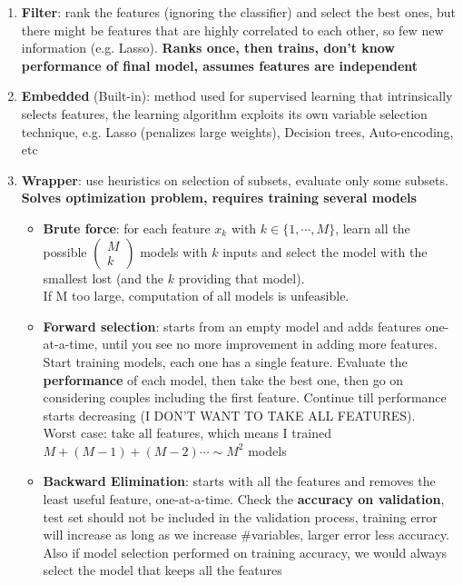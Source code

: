     \begin{enumerate}
        \item \textbf{Filter}: rank the features (ignoring the classifier) and select the best ones, but there might be features that are highly correlated to each other, so few new information (e.g. Lasso). \textbf{Ranks once, then trains, don't know performance of final model, assumes features are independent}
        \item \textbf{Embedded} (Built-in): method used for supervised learning that intrinsically selects features, the learning algorithm exploits its own variable selection technique, e.g. Lasso (penalizes large weights), Decision trees, Auto-encoding, etc
        \item \textbf{Wrapper}: use heuristics on selection of subsets, evaluate only some subsets. \textbf{Solves optimization problem, requires training several models}
        \begin{itemize}
            \item \textbf{Brute force}: for each feature $x_k$ with $k\in\{1,\cdots,M\}$, learn all the possible $\begin{pmatrix}
                M \\ k
            \end{pmatrix}$ models with $k$ inputs and select the model with the smallest lost (and the $k$ providing that model).\\
            If M too large, computation of all models is unfeasible.
            \item \textbf{Forward selection}: starts from an empty model and adds features one-at-a-time, until you see no more improvement in adding more features.\\
            Start training models, each one has a single feature. Evaluate the \textbf{performance} of each model, then take the best one, then go on considering couples including the first feature. Continue till performance starts decreasing (I DON'T WANT TO TAKE ALL FEATURES).\\
            Worst case: take all features, which means I trained $M+(M-1)+(M-2)\cdots\sim M^2$ models
            \item \textbf{Backward Elimination}: starts with all the features and removes the least useful feature, one-at-a-time. Check the \textbf{accuracy on validation}, test set should not be included in the validation process, training error will increase as long as we increase \#variables, larger error less accuracy. Also if model selection performed on training accuracy, we would always select the model that keeps all the features
        \end{itemize}
    \end{enumerate}

